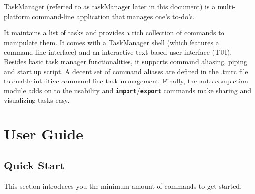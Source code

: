 \documentclass[12pt, a4paper]{article}
\newcommand{\cmdinline}[1]{{\bf \texttt{#1}}}
\begin{document}

TaskManager (referred to as taskManager later in this document) is a multi-platform command-line application that manages one's to-do's.

It maintains a list of tasks and provides a rich collection of
commands to manipulate them. It comes with a TaskManager shell (which
features a command-line interface) and an interactive text-based user
interface (TUI). Besides basic task manager functionalities, it
supports command aliasing, piping and start up script.  A decent set
of command aliases are defined in the .tmrc file to enable
intuitive command line task management. Finally, the auto-completion
module adds on to the usability and \cmdinline{import}/\cmdinline{export} commands make sharing and visualizing tasks easy.

\newpage
\section{User Guide}
\subsection{Quick Start}

This section introduces you the minimum amount of commands to get started.
\end{document}
